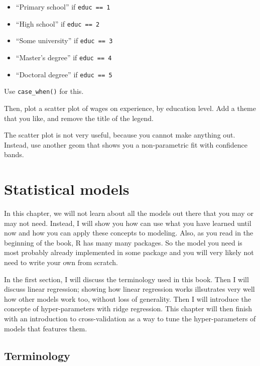 \documentclass[
]{article}
\providecommand{\tightlist}{%
  \setlength{\itemsep}{0pt}\setlength{\parskip}{0pt}}
\begin{document}
\begin{itemize}
\tightlist
\item
  ``Primary school'' if \texttt{educ\ ==\ 1}
\item
  ``High school'' if \texttt{educ\ ==\ 2}
\item
  ``Some university'' if \texttt{educ\ ==\ 3}
\item
  ``Master's degree'' if \texttt{educ\ ==\ 4}
\item
  ``Doctoral degree'' if \texttt{educ\ ==\ 5}
\end{itemize}

Use \texttt{case\_when()} for this.

Then, plot a scatter plot of wages on experience, by education level. Add a theme that you like,
and remove the title of the legend.

The scatter plot is not very useful, because you cannot make anything out. Instead, use another
geom that shows you a non-parametric fit with confidence bands.

\hypertarget{statistical-models}{%
\section{Statistical models}\label{statistical-models}}

In this chapter, we will not learn about all the models out there that you may or may not need.
Instead, I will show you how can use what you have learned until now and how you can apply these
concepts to modeling. Also, as you read in the beginning of the book, R has many many packages. So
the model you need is most probably already implemented in some package and you will very likely
not need to write your own from scratch.

In the first section, I will discuss the terminology used in this book. Then I will discuss
linear regression; showing how linear regression works illsutrates very well how other models
work too, without loss of generality. Then I will introduce the concepte of hyper-parameters
with ridge regression. This chapter will then finish with an introduction to cross-validation as
a way to tune the hyper-parameters of models that features them.

\hypertarget{terminology}{%
\subsection{Terminology}\label{terminology}}
\end{document}
